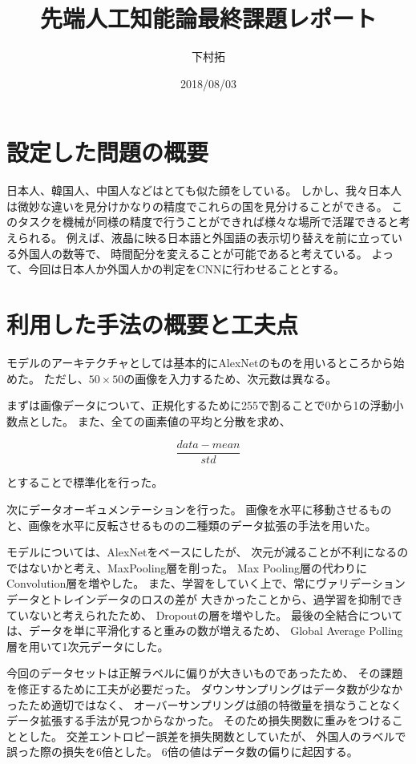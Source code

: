 \documentclass[uplatex]{jsarticle}
\begin{document}
\title{先端人工知能論最終課題レポート}
\author{下村拓}
\date{2018/08/03}
\maketitle


\section{設定した問題の概要}
日本人、韓国人、中国人などはとても似た顔をしている。
しかし、我々日本人は微妙な違いを見分けかなりの精度でこれらの国を見分けることができる。
このタスクを機械が同様の精度で行うことができれば様々な場所で活躍できると考えられる。
例えば、液晶に映る日本語と外国語の表示切り替えを前に立っている外国人の数等で、
時間配分を変えることが可能であると考えている。
よって、今回は日本人か外国人かの判定をCNNに行わせることとする。


\section{利用した手法の概要と工夫点}
モデルのアーキテクチャとしては基本的にAlexNetのものを用いるところから始めた。
ただし、$50\times50$の画像を入力するため、次元数は異なる。

まずは画像データについて、正規化するために255で割ることで0から1の浮動小数点とした。
また、全ての画素値の平均と分散を求め、

\begin{equation}
  \frac{data - mean}{std}
\end{equation}

とすることで標準化を行った。

次にデータオーギュメンテーションを行った。
画像を水平に移動させるものと、画像を水平に反転させるものの二種類のデータ拡張の手法を用いた。

モデルについては、AlexNetをベースにしたが、
次元が減ることが不利になるのではないかと考え、MaxPooling層を削った。
Max Pooling層の代わりにConvolution層を増やした。
また、学習をしていく上で、常にヴァリデーションデータとトレインデータのロスの差が
大きかったことから、過学習を抑制できていないと考えられたため、
Dropoutの層を増やした。
最後の全結合については、データを単に平滑化すると重みの数が増えるため、
Global Average Polling層を用いて1次元データにした。

今回のデータセットは正解ラベルに偏りが大きいものであったため、
その課題を修正するために工夫が必要だった。
ダウンサンプリングはデータ数が少なかったため適切ではなく、
オーバーサンプリングは顔の特徴量を損なうことなくデータ拡張する手法が見つからなかった。
そのため損失関数に重みをつけることとした。
交差エントロピー誤差を損失関数としていたが、
外国人のラベルで誤った際の損失を6倍とした。
6倍の値はデータ数の偏りに起因する。
\end{document}
